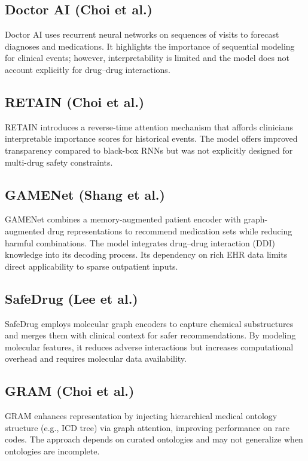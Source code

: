 \documentclass[conference,onecolumn]{IEEEtran}
\begin{document}
\subsection{Doctor AI (Choi et al.)}
Doctor AI uses recurrent neural networks on sequences of visits to forecast diagnoses and medications. It highlights the importance of sequential modeling for clinical events; however, interpretability is limited and the model does not account explicitly for drug–drug interactions.

\subsection{RETAIN (Choi et al.)}
RETAIN introduces a reverse-time attention mechanism that affords clinicians interpretable importance scores for historical events. The model offers improved transparency compared to black-box RNNs but was not explicitly designed for multi-drug safety constraints.

\subsection{GAMENet (Shang et al.)}
GAMENet combines a memory-augmented patient encoder with graph-augmented drug representations to recommend medication sets while reducing harmful combinations. The model integrates drug–drug interaction (DDI) knowledge into its decoding process. Its dependency on rich EHR data limits direct applicability to sparse outpatient inputs.

\subsection{SafeDrug (Lee et al.)}
SafeDrug employs molecular graph encoders to capture chemical substructures and merges them with clinical context for safer recommendations. By modeling molecular features, it reduces adverse interactions but increases computational overhead and requires molecular data availability.

\subsection{GRAM (Choi et al.)}
GRAM enhances representation by injecting hierarchical medical ontology structure (e.g., ICD tree) via graph attention, improving performance on rare codes. The approach depends on curated ontologies and may not generalize when ontologies are incomplete.
\end{document}
